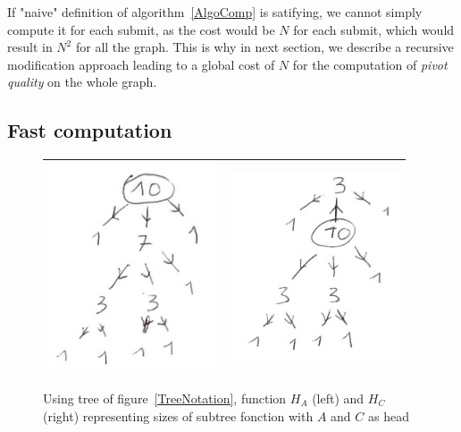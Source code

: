 \documentclass[a4paper]{article}
\begin{document}
If "naive" definition of algorithm~\ref{AlgoComp} is satifying, we cannot simply compute
it for each submit, as the cost would be $N$ for each submit, which would result
in $N^2$ for all the graph.  This is why in next section, we  describe a recursive 
modification approach  leading to a global cost of $N$ for the computation of \emph{pivot quality}
on the whole graph.


\subsection{Fast computation}

\begin{figure}
\centering
\begin{tabular}{||c|c||}
 \hline \hline
\includegraphics[width=5cm]{FIGS/FTD-HeritA.jpg} &
\includegraphics[width=5cm]{FIGS/FTD-HeritC.jpg} 
 \\ \hline \hline
\end{tabular}
\caption{Using tree of figure~\ref{TreeNotation}, function $H_A$ (left) and $H_C$ (right) representing
 sizes of subtree fonction with $A$ and $C$ as head}
\label{TreeHerit}
\end{figure}
\end{document}
